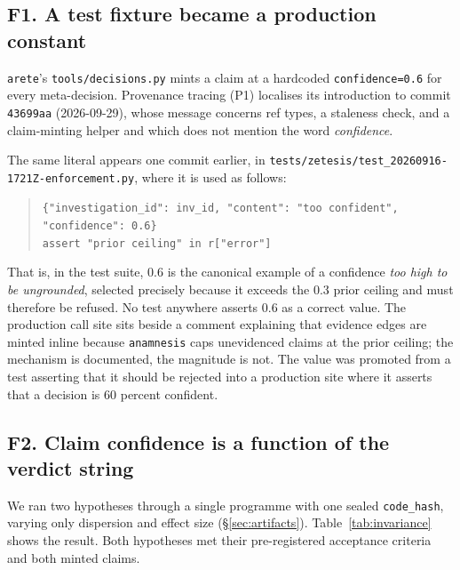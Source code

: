 \documentclass[10pt,twocolumn,letterpaper]{article}
\newcommand{\code}[1]{\texttt{#1}}
\newcommand{\bs}{\allowbreak\hspace{0pt}}
\begin{document}
\subsection{F1. A test fixture became a production constant}
\label{sec:f1}

\code{arete}'s \code{tools/decisions.py} mints a claim at a hardcoded \code{confidence=0.6} for
every meta-decision. Provenance tracing (P1) localises its introduction to commit \code{43699aa}
(2026-09-29), whose message concerns ref types, a staleness check, and a claim-minting helper and
which does not mention the word \emph{confidence}.

The same literal appears one commit earlier, in
\code{tests/zetesis/\bs test\_20260916-1721Z-\bs enforcement.py}, where it is used as follows:

\begin{quote}\small
\code{\{"investigation\_id": inv\_id, "content": "too confident",}\\
\hspace*{2.6em}\code{"confidence": 0.6\}}\\
\code{assert "prior ceiling" in r["error"]}
\end{quote}

That is, in the test suite, $0.6$ is the canonical example of a confidence \emph{too high to be
ungrounded}, selected precisely because it exceeds the $0.3$ prior ceiling and must therefore be
refused. No test anywhere asserts $0.6$ as a correct value. The production call site sits beside a
comment explaining that evidence edges are minted inline because \code{anamnesis} caps unevidenced
claims at the prior ceiling; the mechanism is documented, the magnitude is not. The value was
promoted from a test asserting that it should be rejected into a production site where it asserts
that a decision is $60$ percent confident.

\subsection{F2. Claim confidence is a function of the verdict string}
\label{sec:f2}

We ran two hypotheses through a single programme with one sealed \code{code\_hash}, varying only
dispersion and effect size (\S\ref{sec:artifacts}). Table~\ref{tab:invariance} shows the result.
Both hypotheses met their pre-registered acceptance criteria and both minted claims.
\end{document}
